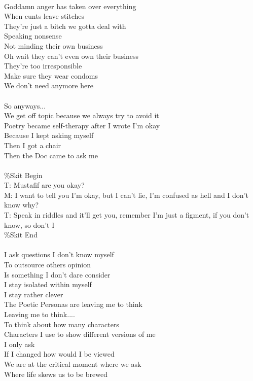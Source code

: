 \documentclass[12pt, b5paper, oneside]{book}
\begin{document}
\\Goddamn anger has taken over everything
\\When cunts leave stitches
\\They're just a bitch we gotta deal with
\\Speaking nonsense
\\Not minding their own business
\\Oh wait they can't even own their business
\\They're too irresponsible
\\Make sure they wear condoms
\\We don't need anymore here
%
\\\\So anyways...
\\We get off topic because we always try to avoid it
\\Poetry became self-therapy after I wrote I'm okay
\\Because I kept asking myself
\\Then I got a chair
\\Then the Doc came to ask me
%
\\\\\%Skit Begin
\\T: Mustafif are you okay?
\\M: I want to tell you I'm okay, but I can't lie, I'm confused as hell and I don't know why?
\\T: Speak in riddles and it'll get you, remember I'm just a figment, if you don't know, so don't I
\\\%Skit End
%
\\\\I ask questions I don't know myself
\\To outsource others opinion
\\Is something I don't dare consider
\\I stay isolated within myself
\\I stay rather clever
\\The Poetic Personas are leaving me to think
\\Leaving me to think....
\\To think about how many characters
\\Characters I use to show different versions of me
\\I only ask
\\If I changed how would I be viewed
\\We are at the critical moment where we ask
\\Where life skews us to be brewed
\end{document}

